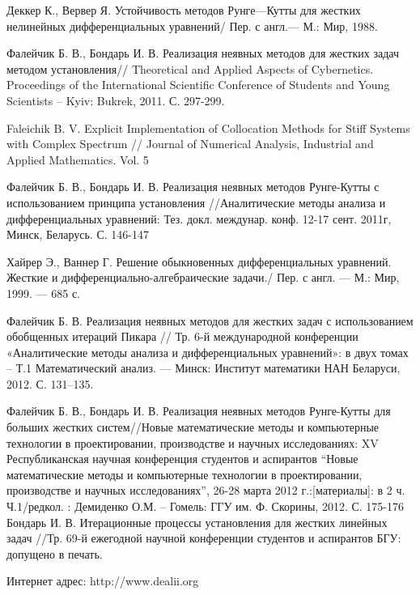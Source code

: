 \documentclass[a4paper, 14pt]{extreport} %
\begin{document}
\newpage

\begin{thebibliography}{99}
Деккер К., Вервер Я. Устойчивость методов Рунге—Кутты для жестких нелинейных дифференциальных уравнений/ Пер. с англ.— М.: Мир, 1988.

Фалейчик Б. В., Бондарь И. В. Реализация неявных методов для жестких задач методом установления// Theoretical and Applied Aspects of Cybernetics. Proceedings of the International Scientific Conference of Students and Young Scientists -- Kyiv: Bukrek, 2011. С. 297-299.

Faleichik B. V. Explicit Implementation of Collocation Methods for Stiff Systems with Complex Spectrum // Journal of Numerical Analysis, Industrial and Applied Mathematics. Vol. 5

Фалейчик Б. В., Бондарь И. В. Реализация неявных методов Рунге-Кутты с использованием принципа установления //Аналитические методы анализа и дифференциальных уравнений: Тез. докл. междунар. конф. 12-17 сент. 2011г, Минск, Беларусь. С. 146-147

Хайрер Э., Ваннер Г.  Решение обыкновенных дифференциальных уравнений. Жесткие и дифференциально-алгебраические задачи./ Пер. с англ. — М.: Мир, 1999. — 685 с.

Фалейчик Б. В. Реализация неявных методов для жестких задач с использованием обобщенных итераций Пикара // Тр. 6-й международной конференции «Аналитические методы анализа и дифференциальных уравнений»: в двух томах – Т.1 Математический анализ. — Минск: Институт математики НАН Беларуси, 2012. С. 131–135.

Фалейчик Б. В., Бондарь И. В. Реализация неявных методов Рунге-Кутты для больших жестких систем//Новые математические методы и компьютерные технологии в проектировании, производстве и научных исследованиях: XV Республиканская научная конференция студентов и аспирантов ``Новые математические методы и компьютерные технологии в проектировании, производстве и научных исследованиях'', 26-28 марта 2012 г.:[материалы]: в 2 ч. Ч.1/редкол. : Демиденко О.М. -- Гомель: ГГУ им. Ф. Скорины, 2012. С. 175-176
Бондарь И. В. Итерационные процессы установления для жестких линейных задач //Тр. 69-й ежегодной научной конференции студентов и аспирантов БГУ: допущено в печать.

 Интернет адрес: http://www.dealii.org
\end{thebibliography}
\end{document}

